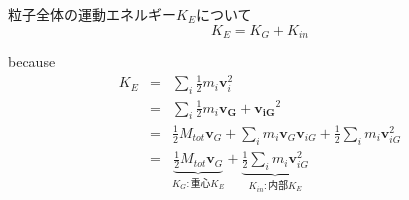 \documentclass[dvipdfmx]{jsarticle}
\begin{document}
\begin{theo}
粒子全体の運動エネルギー$K_E$について \\
$$
K_E = K_G + K_{in}
$$
\end{theo}
because
\begin{eqnarray*}
K_E &=& \sum_i \frac{1}{2}m_i \bm{v}^2_i \\
&=& \sum_i \frac{1}{2}m_i \bm{v_G+v_{iG}}^2 \\
&=& \frac{1}{2}M_{tot}\bm{v}_G + \sum_i m_i \bm{v}_G \bm{v}_{iG} + \frac{1}{2}\sum_i m_i \bm{v}^2_{iG} \\
&=& \underbrace{\frac{1}{2}M_{tot}\bm{v}_G}_{K_G:重心K_E} + \underbrace{\frac{1}{2}\sum_i m_i \bm{v}^2_{iG}}_{K_{in}:内部K_E} \\
\end{eqnarray*}
\end{document}
